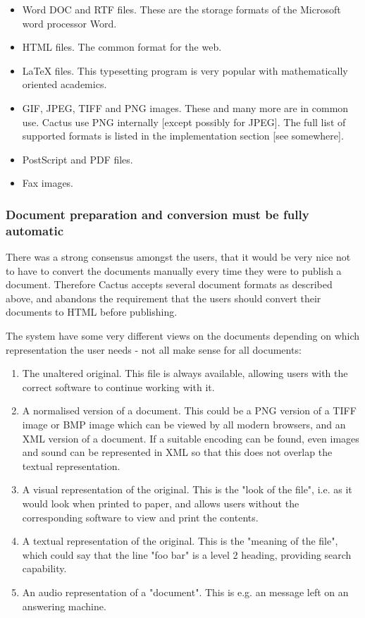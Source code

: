 \begin{itemize}
  
\item 
  Word DOC and RTF files.   These are the storage formats of the
  Microsoft word processor Word.  
\item 
  HTML files.  The common format for the web.
\item 
  LaTeX files.   This typesetting program is very popular with
  mathematically oriented academics.
\item 
  GIF, JPEG, TIFF and PNG images.   These and many more are in common use.  Cactus use PNG internally [except possibly for JPEG].  The full list of supported
formats is listed in the implementation section [see somewhere].
\item 
  PostScript and PDF files.
\item 
  Fax images.
\end{itemize}

\subsubsection{Document preparation and conversion must be fully automatic}

There was a strong consensus amongst the users, that it would be very
nice not to have to convert the documents manually every time they
were to publish a document.  Therefore Cactus accepts several document
formats as described above, and abandons the requirement that the
users should convert their documents to HTML before publishing.

The system have some very different views on the documents depending
on which representation the user needs - not all make sense for all
documents:

\begin{enumerate}
\item The unaltered original.  This file is always available, allowing
  users with the correct software to continue working with it.

\item A normalised version of a document.  This could be a PNG version
  of a TIFF image or BMP image which can be viewed by all modern
  browsers, and an XML version of a document.  If a suitable encoding
  can be found, even images and sound can be represented in XML so
  that this does not overlap the textual representation.

\item A visual representation of the original.  This is the "look of
  the file", i.e. as it would look when printed to paper, and allows
  users without the corresponding software to view and print the
  contents.

\item A textual representation of the original.  This is the "meaning
  of the file", which could say that the line "foo bar" is a level 2
  heading, providing search capability.

  
\item An audio representation of a "document".  This is e.g. an
  message left on an answering machine.
\end{enumerate}

